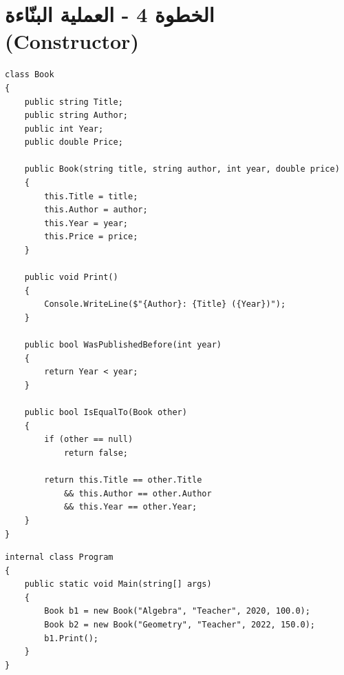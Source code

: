 \documentclass[11pt]{article}
\begin{document}
\section*{الخطوة 4 - العملية البنّاءة (\textenglish{Constructor})}
\begin{boxExample}
\begin{english}
\begin{verbatim}
class Book
{
    public string Title;
    public string Author;
    public int Year;
    public double Price;

    public Book(string title, string author, int year, double price)
    {
        this.Title = title;
        this.Author = author;
        this.Year = year;
        this.Price = price;
    }

    public void Print()
    {
        Console.WriteLine($"{Author}: {Title} ({Year})");
    }

    public bool WasPublishedBefore(int year)
    {
        return Year < year;
    }

    public bool IsEqualTo(Book other)
    {
        if (other == null)
            return false;

        return this.Title == other.Title
            && this.Author == other.Author
            && this.Year == other.Year;
    }
}
\end{verbatim}
\end{english}
\end{boxExample}
\begin{boxExample}
\begin{english}
\begin{verbatim}
internal class Program
{
    public static void Main(string[] args)
    {
        Book b1 = new Book("Algebra", "Teacher", 2020, 100.0);
        Book b2 = new Book("Geometry", "Teacher", 2022, 150.0);
        b1.Print();
    }
}
\end{verbatim}
\end{english}
\end{boxExample}

\clearpage
\end{document}
